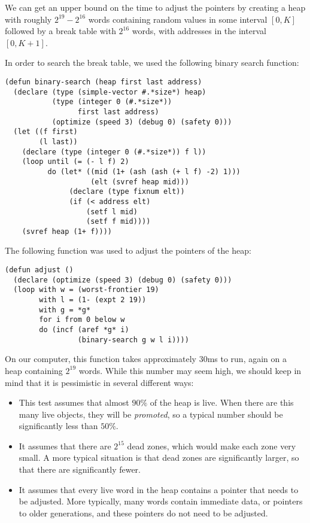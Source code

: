 We can get an upper bound on the time to adjust the pointers by
creating a heap with roughly $2^{19} - 2^{16}$ words containing random
values in some interval $[0,K]$ followed by a break table with
$2^{16}$ words, with addresses in the interval $[0,K+1]$.

In order to search the break table, we used the following binary
search function:

{\small\begin{verbatim}
(defun binary-search (heap first last address)
  (declare (type (simple-vector #.*size*) heap)
           (type (integer 0 (#.*size*)) 
                 first last address)
           (optimize (speed 3) (debug 0) (safety 0)))
  (let ((f first)
        (l last))
    (declare (type (integer 0 (#.*size*)) f l))
    (loop until (= (- l f) 2)
          do (let* ((mid (1+ (ash (ash (+ l f) -2) 1)))
                    (elt (svref heap mid)))
               (declare (type fixnum elt))
               (if (< address elt)
                   (setf l mid)
                   (setf f mid))))
    (svref heap (1+ f))))
\end{verbatim}}

The following function was used to adjust the pointers of the heap:

{\small\begin{verbatim}
(defun adjust ()
  (declare (optimize (speed 3) (debug 0) (safety 0)))
  (loop with w = (worst-frontier 19)
        with l = (1- (expt 2 19))
        with g = *g*
        for i from 0 below w
        do (incf (aref *g* i)
                 (binary-search g w l i))))
\end{verbatim}}

On our computer, this function takes approximately $30$ms to run,
again on a heap containing $2^{19}$ words.  While this number may seem
high, we should keep in mind that it is pessimistic in several
different ways:

\begin{itemize}
\item This test assumes that almost $90\%$ of the heap is live.  When
  there are this many live objects, they will be \emph{promoted}, so a
  typical number should be significantly less than $50\%$.
\item It assumes that there are $2^{15}$ dead zones, which would make
  each zone very small.  A more typical situation is that dead zones
  are significantly larger, so that there are significantly fewer. 
\item It assumes that every live word in the heap contains a pointer
  that needs to be adjusted.  More typically, many words contain
  immediate data, or pointers to older generations, and these pointers
  do not need to be adjusted.
\end{itemize}

